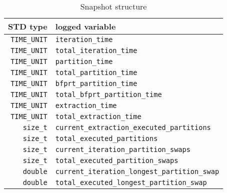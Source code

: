 \begin{table}[!ht]
    \centering
    \caption{Snapshot structure}
    \begin{tabularx}{\linewidth}{|r|X|}%
    \hline
    STD type & logged variable \\ %
    \hline
    \texttt{TIME\_UNIT} & \texttt{iteration\_time} \\ %
    \hline
    \texttt{TIME\_UNIT} & \texttt{total\_iteration\_time} \\ %
    \hline
    \texttt{TIME\_UNIT} & \texttt{partition\_time} \\ %
    \hline
    \texttt{TIME\_UNIT} & \texttt{total\_partition\_time} \\ %
    \hline
    \texttt{TIME\_UNIT} & \texttt{bfprt\_partition\_time} \\ %
    \hline
    \texttt{TIME\_UNIT} & \texttt{total\_bfprt\_partition\_time} \\ %
    \hline
    \texttt{TIME\_UNIT} & \texttt{extraction\_time} \\ %
    \hline
    \texttt{TIME\_UNIT} & \texttt{total\_extraction\_time} \\ %
    \hline
    \texttt{size\_t} & \texttt{current\_extraction\_executed\_partitions} \\ %
    \hline
    \texttt{size\_t} & \texttt{total\_executed\_partitions} \\ %
    \hline
    \texttt{size\_t} & \texttt{current\_iteration\_partition\_swaps} \\ %
    \hline
    \texttt{size\_t} & \texttt{total\_executed\_partition\_swaps} \\ %
    \hline
    \texttt{double} & \texttt{current\_iteration\_longest\_partition\_swap} \\ %
    \hline
    \texttt{double} & \texttt{total\_executed\_longest\_partition\_swap} \\ %

\end{tabularx}
\end{table}
